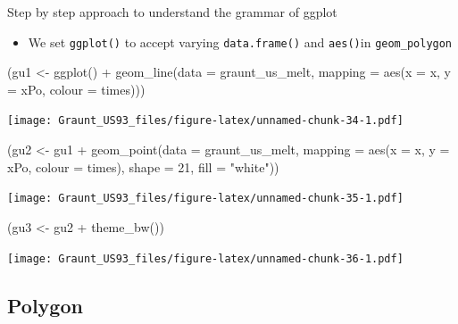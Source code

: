 \documentclass[
]{article}
\newenvironment{Shaded}{\begin{snugshade}}{\end{snugshade}}
\newcommand{\AttributeTok}[1]{\textcolor[rgb]{0.77,0.63,0.00}{#1}}
\newcommand{\DecValTok}[1]{\textcolor[rgb]{0.00,0.00,0.81}{#1}}
\newcommand{\FunctionTok}[1]{\textcolor[rgb]{0.00,0.00,0.00}{#1}}
\newcommand{\NormalTok}[1]{#1}
\newcommand{\OtherTok}[1]{\textcolor[rgb]{0.56,0.35,0.01}{#1}}
\newcommand{\SpecialCharTok}[1]{\textcolor[rgb]{0.00,0.00,0.00}{#1}}
\newcommand{\StringTok}[1]{\textcolor[rgb]{0.31,0.60,0.02}{#1}}
\providecommand{\tightlist}{%
  \setlength{\itemsep}{0pt}\setlength{\parskip}{0pt}}
\begin{document}
Step by step approach to understand the grammar of ggplot

\begin{itemize}
\tightlist
\item
  We set \texttt{ggplot()} to accept varying \texttt{data.frame()} and
  \texttt{aes()}in \texttt{geom\_polygon}
\end{itemize}

\begin{Shaded}
\begin{Highlighting}[]
\NormalTok{(gu1 }\OtherTok{\textless{}{-}} \FunctionTok{ggplot}\NormalTok{() }\SpecialCharTok{+} 
  \FunctionTok{geom\_line}\NormalTok{(}\AttributeTok{data =}\NormalTok{ graunt\_us\_melt, }
            \AttributeTok{mapping =} \FunctionTok{aes}\NormalTok{(}\AttributeTok{x =}\NormalTok{ x, }\AttributeTok{y =}\NormalTok{ xPo, }\AttributeTok{colour =}\NormalTok{ times)))}
\end{Highlighting}
\end{Shaded}

\texttt{[image: Graunt\_US93\_files/figure-latex/unnamed-chunk-34-1.pdf]}

\begin{Shaded}
\begin{Highlighting}[]
\NormalTok{(gu2 }\OtherTok{\textless{}{-}}\NormalTok{ gu1 }\SpecialCharTok{+} 
  \FunctionTok{geom\_point}\NormalTok{(}\AttributeTok{data =}\NormalTok{ graunt\_us\_melt, }
             \AttributeTok{mapping =} \FunctionTok{aes}\NormalTok{(}\AttributeTok{x =}\NormalTok{ x, }\AttributeTok{y =}\NormalTok{ xPo, }\AttributeTok{colour =}\NormalTok{ times), }
             \AttributeTok{shape =} \DecValTok{21}\NormalTok{, }\AttributeTok{fill =} \StringTok{"white"}\NormalTok{))}
\end{Highlighting}
\end{Shaded}

\texttt{[image: Graunt\_US93\_files/figure-latex/unnamed-chunk-35-1.pdf]}

\begin{Shaded}
\begin{Highlighting}[]
\NormalTok{(gu3 }\OtherTok{\textless{}{-}}\NormalTok{ gu2 }\SpecialCharTok{+} 
  \FunctionTok{theme\_bw}\NormalTok{()) }
\end{Highlighting}
\end{Shaded}

\texttt{[image: Graunt\_US93\_files/figure-latex/unnamed-chunk-36-1.pdf]}

\hypertarget{polygon}{%
\subsection{Polygon}\label{polygon}}
\end{document}
